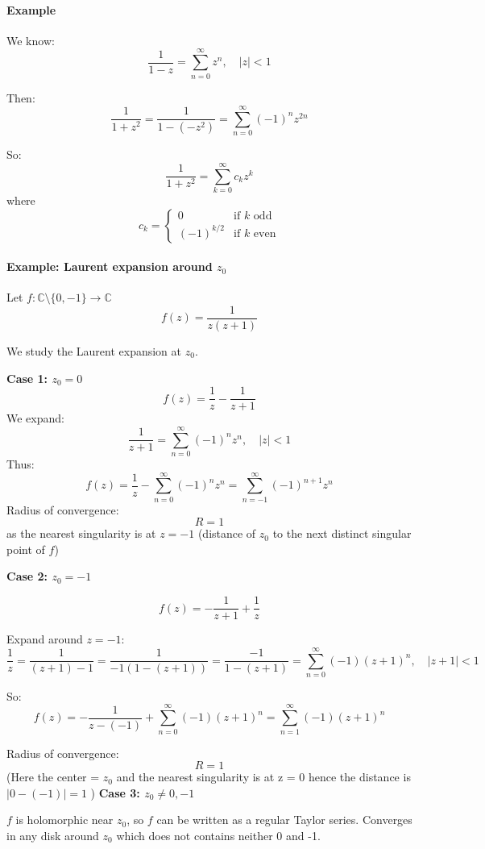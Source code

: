 

\paragraph{Example}
We know:
\[
\frac{1}{1-z} = \sum_{n=0}^{\infty} z^n, \quad |z|<1
\]

Then:
\[
\frac{1}{1+z^2} = \frac{1}{1-(-z^2)} = \sum_{n=0}^{\infty} (-1)^n z^{2n}
\]

So:
\[
\frac{1}{1+z^2} = \sum_{k=0}^{\infty} c_k z^k
\]
where
\[
c_k =
\begin{cases}
0 & \text{if $k$ odd} \\
(-1)^{k/2} & \text{if $k$ even}
\end{cases}
\]

\paragraph{Example: Laurent expansion around $z_0$}

Let $f: \mathbb{C} \setminus \{0, -1 \} \to \mathbb{C}$
\[
f(z) = \frac{1}{z(z+1)}
\]

We study the Laurent expansion at $z_0$.

\textbf{Case 1: $z_0 = 0$}
\[
f(z) = \frac{1}{z} - \frac{1}{z+1}
\]
We expand:
\[
\frac{1}{z+1} = \sum_{n=0}^{\infty} (-1)^n z^n, \quad |z|<1
\]
Thus:
\[
f(z) = \frac{1}{z} - \sum_{n=0}^{\infty} (-1)^n z^n
= \sum_{n=-1}^{\infty} (-1)^{n+1} z^n
\]
Radius of convergence:
\[
R = 1
\]
as the nearest singularity is at $z = -1$
(distance of $z_0$ to the next distinct singular point of $f$)

\textbf{Case 2: $z_0 = -1$}

\[
f(z) = -\frac{1}{z+1} + \frac{1}{z}
\]

Expand around $z=-1$:
\[
\frac{1}{z} = \frac{1}{(z+1)-1} = 
\frac{1}{-1(1-(z+1))}= \frac{-1}{1-(z+1)}=\sum_{n=0}^{\infty} (-1) (z+1)^n, \quad |z+1|<1
\]

So:
\[
f(z) = -\frac{1}{z - (-1)} + \sum_{n=0}^{\infty} (-1) (z+1)^n = \sum_{n=1}^{\infty}(-1)(z+1)^n 
\]

Radius of convergence:
\[
R = 1
\]
(Here the center = $z_0$ and the nearest singularity is at z = 0 hence the distance is $\left|0 - (-1)\right| = 1 $ ) 
\textbf{Case 3: $z_0 \neq 0, -1$}

$f$ is holomorphic near $z_0$, so $f$ can be written as a regular Taylor series. Converges in any disk around $z_0$ which does not contains neither 0 and -1. 


